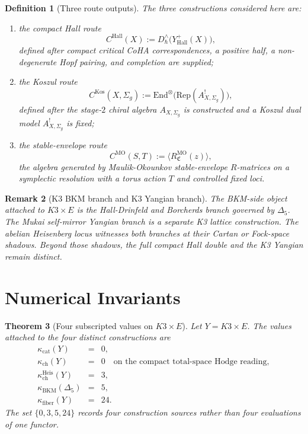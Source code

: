 \documentclass[11pt]{article}
\newtheorem{theorem}{Theorem}
\newtheorem{definition}[theorem]{Definition}
\newtheorem{remark}[theorem]{Remark}
\providecommand{\Rep}{\mathrm{Rep}}
\providecommand{\End}{\mathrm{End}}
\begin{document}
\begin{definition}[Three route outputs]
\label{def:three-route-outputs}
The three constructions considered here are:
\begin{enumerate}[label=\textup{(\roman*)}, leftmargin=2.0em]
\item the compact Hall route
\[
 C^{\mathrm{Hall}}(X)
 :=
 D_\hbar^\wedge\bigl(Y^+_{\mathrm{Hall}}(X)\bigr),
\]
defined after compact critical CoHA correspondences, a positive half,
a non-degenerate Hopf pairing, and completion are supplied;
\item the Koszul route
\[
 C^{\mathrm{Kos}}(X,\Sigma_g)
 :=
 \End^\otimes\!\bigl(\Rep(A_{X,\Sigma_g}^{!})\bigr),
\]
defined after the stage-$2$ chiral algebra $A_{X,\Sigma_g}$ is
constructed and a Koszul dual model $A_{X,\Sigma_g}^{!}$ is fixed;
\item the stable-envelope route
\[
 C^{\mathrm{MO}}(S,T)
 :=
 \langle R^{\mathrm{MO}}_{\mathfrak C}(z)\rangle,
\]
the algebra generated by Maulik-Okounkov stable-envelope $R$-matrices
on a symplectic resolution with a torus action $T$ and controlled fixed
loci.
\end{enumerate}
\end{definition}

\begin{remark}[K3 BKM branch and K3 Yangian branch]
\label{rem:bkm-yangian-separation}
The BKM-side object attached to $K3\times E$ is the Hall-Drinfeld and
Borcherds branch governed by $\Delta_5$. The Mukai self-mirror Yangian
branch is a separate K3 lattice construction. The abelian Heisenberg
locus witnesses both branches at their Cartan or Fock-space shadows.
Beyond those shadows, the full compact Hall double and the K3 Yangian
remain distinct.
\end{remark}

\section{Numerical Invariants}
\label{sec:numerical-invariants}

\begin{theorem}[Four subscripted values on $K3\times E$]
\label{thm:k3e-four-values}
Let $Y=K3\times E$. The values attached to the four distinct
constructions are
\[
\begin{array}{ccl}
\kappa_{\mathrm{cat}}(Y) &=& 0,\\[2pt]
\kappa_{\mathrm{ch}}(Y) &=& 0
  \quad\text{on the compact total-space Hodge reading},\\[2pt]
\kappa_{\mathrm{ch}}^{\mathrm{Heis}}(Y) &=& 3,\\[2pt]
\kappa_{\mathrm{BKM}}(\Delta_5) &=& 5,\\[2pt]
\kappa_{\mathrm{fiber}}(Y) &=& 24.
\end{array}
\]
The set $\{0,3,5,24\}$ records four construction sources rather than
four evaluations of one functor.
\end{theorem}
\end{document}
